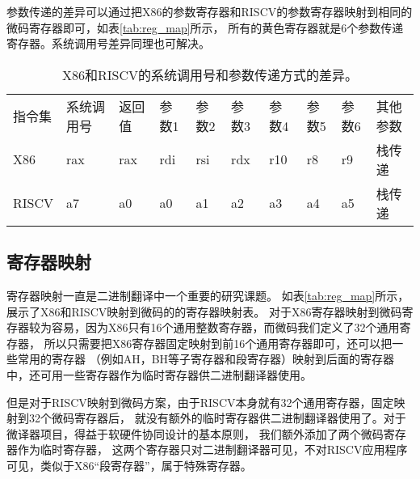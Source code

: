 参数传递的差异可以通过把X86的参数寄存器和RISCV的参数寄存器映射到相同的微码寄存器即可，如表\ref{tab:reg_map}所示，
所有的黄色寄存器就是6个参数传递寄存器。系统调用号差异同理也可解决。



\begin{table}[h]
    \centering
    \begin{adjustbox}{width=\textwidth}
      \begin{tabular}{llllllllll}
      \rowcolor[HTML]{FFCC67} 
      \cellcolor[HTML]{FBE5D6}指令集 & \cellcolor[HTML]{FBE5D6}系统调用号 & \cellcolor[HTML]{FBE5D6}返回值 & 参数1 & 参数2 & 参数3 & 参数4 & 参数5 & 参数6 & 其他参数 \\
      X86                         & rax                           & rax                         & rdi & rsi & rdx & r10 & r8  & r9  & 栈传递  \\
      RISCV                       & a7                            & a0                          & a0  & a1  & a2  & a3  & a4  & a5  & 栈传递 
      \end{tabular}
    \end{adjustbox}
    \caption{X86和RISCV的系统调用号和参数传递方式的差异。}
    \label{tab:syscall}
  \end{table}
  

\subsection{寄存器映射}

寄存器映射一直是二进制翻译中一个重要的研究课题。
如表\ref{tab:reg_map}所示，展示了X86和RISCV映射到微码的的寄存器映射表。
对于X86寄存器映射到微码寄存器较为容易，因为X86只有16个通用整数寄存器，而微码我们定义了32个通用寄存器，
所以只需要把X86寄存器固定映射到前16个通用寄存器即可，还可以把一些常用的寄存器
（例如AH，BH等子寄存器和段寄存器）映射到后面的寄存器中，还可用一些寄存器作为临时寄存器供二进制翻译器使用。

但是对于RISCV映射到微码方案，由于RISCV本身就有32个通用寄存器，固定映射到32个微码寄存器后，
就没有额外的临时寄存器供二进制翻译器使用了。对于微译器项目，得益于软硬件协同设计的基本原则，
我们额外添加了两个微码寄存器作为临时寄存器，
这两个寄存器只对二进制翻译器可见，不对RISCV应用程序可见，类似于X86“段寄存器”，属于特殊寄存器。




